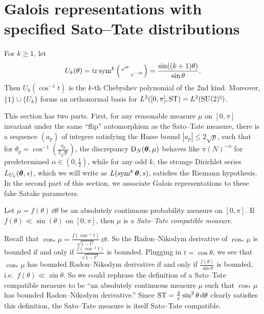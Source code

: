 




\section{Galois representations with specified Sato--Tate distributions}

For $k\geqslant 1$, let 
\[
	U_k(\theta) = \operatorname{tr}\operatorname{sym}^k\left(\begin{smallmatrix} e^{i\theta} &  \\  & e^{- i \theta} \end{smallmatrix}\right) = \frac{\sin((k+1)\theta)}{\sin\theta} .
\]
Then $U_k(\cos^{-1} t)$ is the $k$-th Chebyshev polynomial of the 2nd kind. 
Moreover, $\{1\}\cup\{U_k\}$ forms an orthonormal basis for 
$L^2([0,\pi],\mathrm{ST}) = L^2(\operatorname{SU}(2)^\natural)$. 

This section has two parts. First, for any reasonable measure $\mu$ on 
$[0,\pi]$ invariant under the same ``flip'' automorphism as the Sato--Tate 
measure, there is a sequence $(a_p)$ of integers satisfying the Hasse 
bound $|a_p|\leqslant 2\sqrt p$, such that for 
$\theta_p = \cos^{-1}\left(\frac{a_p}{2\sqrt p}\right)$, the discrepancy 
$\operatorname{D}_N({\boldsymbol\theta},\mu)$ behaves like $\pi(N)^{-\alpha}$ for predetermined 
$\alpha\in \left(0,\frac 1 2\right)$, while for any odd $k$, the strange 
Dirichlet series $L_{U_k}({\boldsymbol\theta},s)$, which we will write as 
$L(\operatorname{sym}^k {\boldsymbol\theta},s)$, satisfies the Riemann hypothesis. In the second part of 
this section, we associate Galois representations to these fake Satake 
parameters. 

\begin{definition}
Let $\mu = f(\theta)\, \dd \theta$ be an absolutely continuous probability 
measure on $[0,\pi]$. If $f(\theta) \ll \sin(\theta)$ on $[0,\pi]$, then $\mu$ 
is a \emph{Sato--Tate compatible measure}. 
\end{definition}

Recall that $\cos_\ast\mu = \frac{f(\cos^{-1} t)}{\sqrt{1-t^2}}\, \dd t$. So 
the Radon--Nikodym derivative of $\cos_\ast\mu$ is bounded if and only if 
$\frac{f(\cos^{-1} t)}{\sqrt{1-t^2}}$ is bounded. Plugging in 
$t = \cos\theta$, we see that $\cos_\ast\mu$ has bounded Radon--Nikodym 
derivative if and only if $\frac{f(\theta)}{\sin\theta}$ is bounded, 
i.e.~$f(\theta) \ll \sin\theta$. So we could rephrase the definition of a 
Sato--Tate compatible measure to be ``an absolutely continuous measure $\mu$ 
such that $\cos_\ast\mu$ has bounded Radon--Nikodym derivative.'' 
Since $\mathrm{ST} = \frac 2 \pi \sin^2\theta\, \mathrm{d}\theta$ clearly satisfies this 
definition, the Sato--Tate measure is itself Sato--Tate compatible. 


